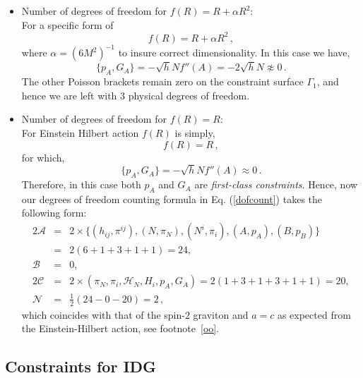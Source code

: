 \documentclass[a4paper,12pt]{article}
\newcommand{\Ga}{\Gamma}
\newcommand{\+}{^{\dagger}}
\newcommand{\2}{\frac{1}{2}}
\newcommand{\3}{\frac{1}{3}}
\newcommand{\4}{\frac{1}{4}}
\newcommand{\6}{\frac{1}{6}}
\newcommand{\8}{\frac{1}{8}}
\begin{document}
\begin{itemize}

\item{Number of degrees of freedom for $f(R)=R+\alpha R^{2}$:\\
For a specific form of 
\begin{equation}
f(R)=R+\alpha R^{2}\,,
\end{equation}
where $\alpha=(6M^{2})^{-1}$ to insure correct dimensionality. In this case we have, 
\begin{equation}
\{p_A,G_A\}=-\sqrt{h}Nf''(A)=-2\sqrt{h}N\not\approx 0\,.
\end{equation}
The other Poisson brackets remain zero on the constraint surface $\Ga_1$, and hence we are left with $3$ physical degrees of freedom. }

\item{Number of degrees of freedom for $f(R)=R$:\\
For Einstein Hilbert action $f(R)$ is simply,
\begin{equation}
f(R)=R\,,
\end{equation} 
for which, 
\begin{equation}
\{p_A,G_A\}=-\sqrt{h}Nf''(A)\approx0\,.
\end{equation}
Therefore, in this case both $p_A$ and $G_A$ are {\it {first-class constraints}}. Hence, now our degrees of freedom counting formula in Eq. (\ref{dofcount})
takes the following form:
\begin{eqnarray}
2\mathcal{A}&=&2\times\{(h_{ij}, \pi^{ij}),(N,\pi_N),(N^i, \pi_i),(A,p_A),(B,p_B)\}\nonumber\\
&=&2(6+1+3+1+1)=24, \nonumber\\
\mathcal{B}&=&0,\nonumber\\
2\mathcal{C}&=&2\times(\pi_N,\pi_i,\mathcal{H}_N,H_{i},p_{A},G_{A})=2(1+3+1+3+1+1)=20,\nonumber\\
\mathcal{N}&=& \frac{1}{2}(24-0-20)=2\,,
\end{eqnarray}
which coincides with that of the spin-$2$ graviton and $a=c$ as expected from the Einstein-Hilbert action, see footnote~\ref{oo}.}
\end{itemize}





\subsection{Constraints for IDG  }
\end{document}
